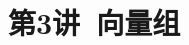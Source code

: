 \documentclass[12pt]{exam}
\begin{document}
\section{第3讲\ 向量组}
\newpage\
\newpage\
\newpage
\end{document}
